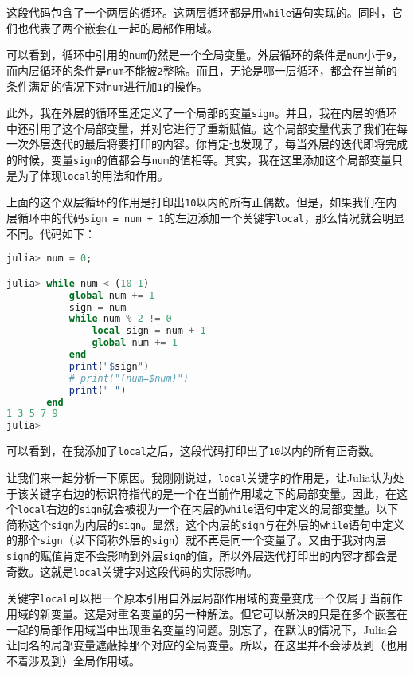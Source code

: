 这段代码包含了一个两层的循环。这两层循环都是用\verb`while`语句实现的。同时，它们也代表了两个嵌套在一起的局部作用域。

可以看到，循环中引用的\verb`num`仍然是一个全局变量。外层循环的条件是\verb`num`小于\verb`9`，而内层循环的条件是\verb`num`不能被\verb`2`整除。而且，无论是哪一层循环，都会在当前的条件满足的情况下对\verb`num`进行加\verb`1`的操作。

此外，我在外层的循环里还定义了一个局部的变量\verb`sign`。并且，我在内层的循环中还引用了这个局部变量，并对它进行了重新赋值。这个局部变量代表了我们在每一次外层迭代的最后将要打印的内容。你肯定也发现了，每当外层的迭代即将完成的时候，变量\verb`sign`的值都会与\verb`num`的值相等。其实，我在这里添加这个局部变量只是为了体现\verb`local`的用法和作用。

上面的这个双层循环的作用是打印出\verb`10`以内的所有正偶数。但是，如果我们在内层循环中的代码\verb`sign = num + 1`的左边添加一个关键字\verb`local`，那么情况就会明显不同。代码如下：

\begin{lstlisting}[language=julia]
julia> num = 0;

julia> while num < (10-1) 
           global num += 1
           sign = num
           while num % 2 != 0
               local sign = num + 1
               global num += 1
           end
           print("$sign")
           # print("(num=$num)")
           print(" ")
       end
1 3 5 7 9 
julia> 
\end{lstlisting}

可以看到，在我添加了\verb`local`之后，这段代码打印出了\verb`10`以内的所有正奇数。

让我们来一起分析一下原因。我刚刚说过，\verb`local`关键字的作用是，让Julia认为处于该关键字右边的标识符指代的是一个在当前作用域之下的局部变量。因此，在这个\verb`local`右边的\verb`sign`就会被视为一个在内层的\verb`while`语句中定义的局部变量。以下简称这个\verb`sign`为内层的\verb`sign`。显然，这个内层的\verb`sign`与在外层的\verb`while`语句中定义的那个\verb`sign`（以下简称外层的\verb`sign`）就不再是同一个变量了。又由于我对内层\verb`sign`的赋值肯定不会影响到外层\verb`sign`的值，所以外层迭代打印出的内容才都会是奇数。这就是\verb`local`关键字对这段代码的实际影响。

关键字\verb`local`可以把一个原本引用自外层局部作用域的变量变成一个仅属于当前作用域的新变量。这是对重名变量的另一种解法。但它可以解决的只是在多个嵌套在一起的局部作用域当中出现重名变量的问题。别忘了，在默认的情况下，Julia会让同名的局部变量遮蔽掉那个对应的全局变量。所以，在这里并不会涉及到（也用不着涉及到）全局作用域。

